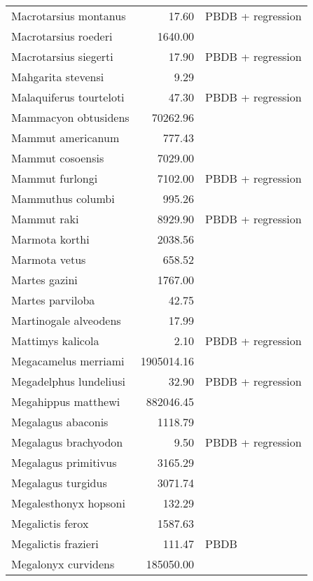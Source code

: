 \begin{table}[ht]
\begin{tabular}{lrl}
  Macrotarsius montanus & 17.60 & PBDB + regression \\ 
  Macrotarsius roederi & 1640.00 & \cite{Soligo2006} \\ 
  Macrotarsius siegerti & 17.90 & PBDB + regression \\ 
  Mahgarita stevensi & 9.29 & \cite{Worthman1893} \\ 
  Malaquiferus tourteloti & 47.30 & PBDB + regression \\ 
  Mammacyon obtusidens & 70262.96 & \cite{Tomiya2013} \\ 
  Mammut americanum & 777.43 & \cite{Smith2004} \\ 
  Mammut cosoensis & 7029.00 & \cite{Secord2008a} \\ 
  Mammut furlongi & 7102.00 & PBDB + regression \\ 
  Mammuthus columbi & 995.26 & \cite{Smith2004} \\ 
  Mammut raki & 8929.90 & PBDB + regression \\ 
  Marmota korthi & 2038.56 & \cite{Tomiya2013} \\ 
  Marmota vetus & 658.52 & \cite{Tomiya2013} \\ 
  Martes gazini & 1767.00 & \cite{McKenna2011} \\ 
  Martes parviloba & 42.75 & \cite{Macdonald1951} \\ 
  Martinogale alveodens & 17.99 & \cite{Tomiya2013} \\ 
  Mattimys kalicola & 2.10 & PBDB + regression \\ 
  Megacamelus merriami & 1905014.16 & \cite{Tomiya2013} \\ 
  Megadelphus lundeliusi & 32.90 & PBDB + regression \\ 
  Megahippus matthewi & 882046.45 & \cite{Tomiya2013} \\ 
  Megalagus abaconis & 1118.79 & \cite{Tomiya2013} \\ 
  Megalagus brachyodon & 9.50 & PBDB + regression \\ 
  Megalagus primitivus & 3165.29 & \cite{Tomiya2013} \\ 
  Megalagus turgidus & 3071.74 & \cite{Tomiya2013} \\ 
  Megalesthonyx hopsoni & 132.29 & \cite{Hay1916} \\ 
  Megalictis ferox & 1587.63 & \cite{Tomiya2013} \\ 
  Megalictis frazieri & 111.47 & PBDB \\ 
  Megalonyx curvidens & 185050.00 & \cite{McDonald1995} \\ 

\end{tabular}
\end{table}
